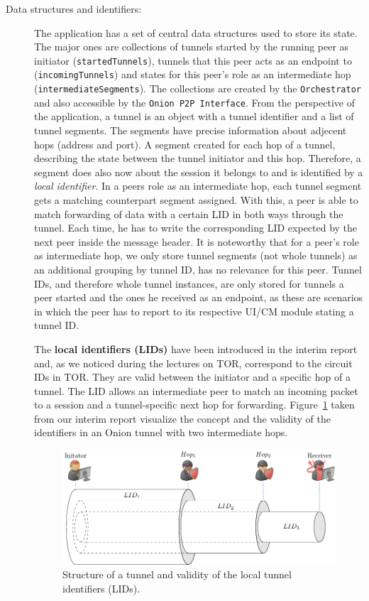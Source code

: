 \documentclass[paper=letter, fontsize=12pt]{article}
\begin{document}
\begin{description}
    \item [Data structures and identifiers:] The application has a set of central data structures used to store its state. The major ones are collections of tunnels started by the running peer as initiator (\texttt{startedTunnels}), tunnels that this peer acts as an endpoint to (\texttt{incomingTunnels}) and states for this peer's role as an intermediate hop (\texttt{intermediateSegments}). The collections are created by the \texttt{Orchestrator} and also accessible by the \texttt{Onion P2P Interface}. 
    From the perspective of the application, a tunnel is an object with a tunnel identifier and a list of tunnel segments. The segments have precise information about adjecent hops (address and port). A segment created for each hop of a tunnel, describing the state between the tunnel initiator and this hop. Therefore, a segment does also now about the session it belongs to and is identified by a \emph{local identifier}. In a peers role as an intermediate hop, each tunnel segment gets a matching counterpart segment assigned. With this, a peer is able to match forwarding of data with a certain LID in both ways through the tunnel. Each time, he has to write the corresponding LID expected by the next peer inside the message header. It is noteworthy that for a peer's role as intermediate hop, we only store tunnel segments (not whole tunnels) as an additional grouping by tunnel ID, has no relevance for this peer. Tunnel IDs, and therefore whole tunnel instances, are only stored for tunnels a peer started and the ones he received as an endpoint, as these are scenarios in which the peer has to report to its respective UI/CM module stating a tunnel ID. 

    The \textbf{local identifiers (LIDs)} have been introduced in the interim report and, as we noticed during the lectures on TOR, correspond to the circuit IDs in TOR. They are valid between the initiator and a specific hop of a tunnel. The LID allows an intermediate peer to match an incoming packet to a session and a tunnel-specific next hop for forwarding. Figure~\ref{fig:lids} taken from our interim report visualize the concept and the validity of the identifiers in an Onion tunnel with two intermediate hops.

    \begin{figure}[ht]
    \centering
    \includegraphics[width=.94\textwidth,right]{images/lids.pdf}
    \caption{Structure of a tunnel and validity of the local tunnel identifiers (LIDs).}
    \label{fig:lids}
    \end{figure}
\end{description}
\end{document}
